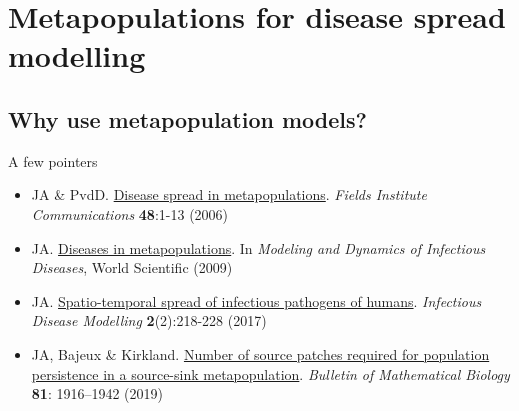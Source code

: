 \documentclass[aspectratio=169]{beamer}\usepackage[]{graphicx}\usepackage[]{xcolor}
\begin{document}
\section{Metapopulations for disease spread modelling}
\subsection{Why use metapopulation models?}


\begin{frame}{A few pointers}
	\begin{itemize}
		\item JA \& PvdD. \href{https://julien-arino.github.io/assets/pdf/papers/2006_ArinoPvdD-FIC48.pdf}{Disease spread in metapopulations}. \emph{Fields Institute Communications} \textbf{48}:1-13 (2006)
		\vfill
		\item JA. \href{https://julien-arino.github.io/assets/pdf/papers/2009_Arino-metapopulations.pdf}{Diseases in metapopulations}. In \emph{Modeling and Dynamics of Infectious Diseases}, World Scientific (2009)
		\vfill
		\item JA. \href{https://doi.org/10.1016/j.idm.2017.05.001}{Spatio-temporal spread of infectious pathogens of humans}. \emph{Infectious Disease Modelling} \textbf{2}(2):218-228 (2017)
		\vfill
		\item JA, Bajeux \& Kirkland. \href{https://doi.org/10.1007/s11538-019-00593-1}{Number of source patches required for population persistence in a source-sink metapopulation}. \emph{Bulletin of Mathematical Biology} \textbf{81}: 1916–1942 (2019) 
	\end{itemize}
\end{frame}
\end{document}
